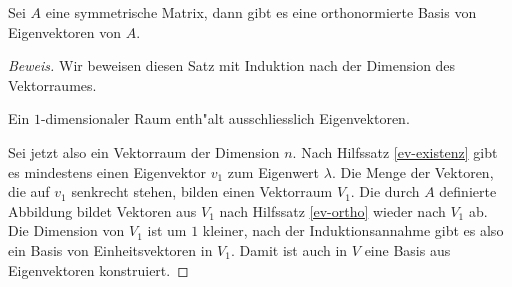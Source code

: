 \begin{satz}
\label{satz:symmetrischdiagonalisierbar}
Sei $A$ eine symmetrische Matrix, dann gibt es eine orthonormierte Basis
von Eigenvektoren von $A$.
\end{satz}

\begin{proof}[Beweis]
Wir beweisen diesen Satz mit Induktion nach der Dimension des Vektorraumes.

Ein $1$-dimensionaler Raum enth"alt ausschliesslich Eigenvektoren.

Sei jetzt also ein Vektorraum der Dimension $n$.
Nach Hilfssatz \ref{ev-existenz} gibt es mindestens einen Eigenvektor $v_1$
zum Eigenwert $\lambda$.  Die Menge der Vektoren, die auf $v_1$ senkrecht
stehen, bilden einen Vektorraum $V_1$. Die durch $A$ definierte Abbildung
bildet Vektoren aus $V_1$ nach Hilfssatz \ref{ev-ortho} wieder nach
$V_1$ ab. Die Dimension von $V_1$ ist um $1$ kleiner, nach der
Induktionsannahme gibt es also ein Basis von Einheitsvektoren in $V_1$.
Damit ist auch in $V$ eine Basis aus Eigenvektoren konstruiert.
\end{proof}

